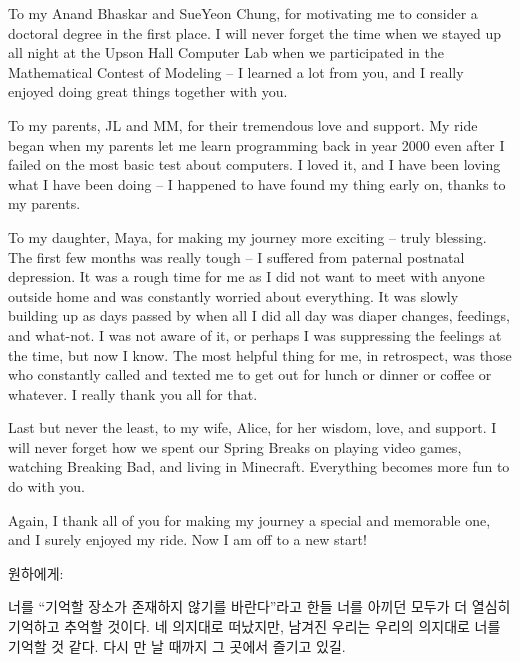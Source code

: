 To my Anand Bhaskar and SueYeon Chung, for motivating me to consider a doctoral degree in the first place. I will never forget the time when we stayed up all night at the Upson Hall Computer Lab when we participated in the Mathematical Contest of Modeling -- I learned a lot from you, and I really enjoyed doing great things together with you. 

To my parents, JL and MM, for their tremendous love and support. My ride began when my parents let me learn programming back in year 2000 even after I failed on the most basic test about computers. I loved it, and I have been loving what I have been doing -- I happened to have found my thing early on, thanks to my parents. 

To my daughter, Maya, for making my journey more exciting -- truly blessing. The first few months was really tough -- I suffered from paternal postnatal depression. It was a rough time for me as I did not want to meet with anyone outside home and was constantly worried about everything. It was slowly building up as days passed by when all I did all day was diaper changes, feedings, and what-not. I was not aware of it, or perhaps I was suppressing the feelings at the time, but now I know. The most helpful thing for me, in retrospect, was those who constantly called and texted me to get out for lunch or dinner or coffee or whatever. I really thank you all for that.

Last but never the least, to my wife, Alice, for her wisdom, love, and support. I will never forget how we spent our Spring Breaks on playing video games, watching Breaking Bad, and living in Minecraft. Everything becomes more fun to do with you.

Again, I thank all of you for making my journey a special and memorable one, and I surely enjoyed my ride. Now I am off to a new start!


\vspace{10 em}

원하에게: 

너를 ``기억할 장소가 존재하지 않기를 바란다''라고 한들 너를 아끼던 모두가 더 열심히 기억하고 추억할 것이다. 네 의지대로 떠났지만, 남겨진 우리는 우리의 의지대로 너를 기억할 것 같다. 다시 만 날 때까지 그 곳에서 즐기고 있길.
